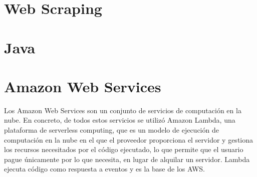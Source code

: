 \section{Web Scraping}

\section{Java}

\section{Amazon Web Services}

Los Amazon Web Services son un conjunto de servicios de computación en la nube. En concreto, de todos estos servicios se utilizó Amazon Lambda, una plataforma de serverless computing, que es un modelo de ejecución de computación en la nube en el que el proveedor proporciona el servidor y gestiona los recursos necesitados por el código ejecutado, lo que permite que el usuario pague únicamente por lo que necesita, en lugar de alquilar un servidor. Lambda ejecuta código como respuesta a eventos y es la base de los AWS.

